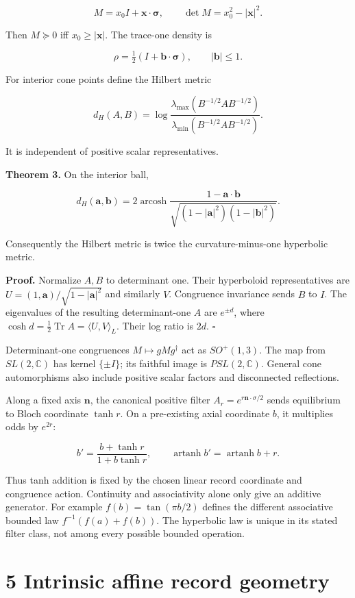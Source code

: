 \documentclass[
  11pt,
  a4paper,
]{article}
\begin{document}
\[M=x_0I+\mathbf x\cdot\boldsymbol\sigma,\qquad
\det M=x_0^2-|\mathbf x|^2.\]

Then \(M\succeq0\) iff \(x_0\ge|\mathbf x|\). The trace-one density is

\[\rho=\tfrac12(I+\mathbf b\cdot\boldsymbol\sigma),\qquad |\mathbf b|\le1.\]

For interior cone points define the Hilbert metric

\[d_H(A,B)=\log\frac{\lambda_{\max}(B^{-1/2}AB^{-1/2})}
{\lambda_{\min}(B^{-1/2}AB^{-1/2})}.\]

It is independent of positive scalar representatives.

\textbf{Theorem 3.} On the interior ball,

\[d_H(\mathbf a,\mathbf b)=2\operatorname{arcosh}
\frac{1-\mathbf a\cdot\mathbf b}
{\sqrt{(1-|\mathbf a|^2)(1-|\mathbf b|^2)}}.\]

Consequently the Hilbert metric is twice the curvature-minus-one hyperbolic metric.

\textbf{Proof.} Normalize \(A,B\) to determinant one. Their hyperboloid representatives are \(U=(1,\mathbf a)/\sqrt{1-|\mathbf a|^2}\) and similarly \(V\). Congruence invariance sends \(B\) to \(I\). The eigenvalues of the resulting determinant-one \(A\) are \(e^{\pm d}\), where \(\cosh d=\tfrac12\operatorname{Tr}A=\langle U,V\rangle_L\). Their log ratio is \(2d\). \(\square\)

Determinant-one congruences \(M\mapsto gMg^\dagger\) act as \(SO^+(1,3)\). The map from \(SL(2,\mathbb C)\) has kernel \(\{\pm I\}\); its faithful image is \(PSL(2,\mathbb C)\). General cone automorphisms also include positive scalar factors and disconnected reflections.

Along a fixed axis \(\mathbf n\), the canonical positive filter \(A_r=e^{r\mathbf n\cdot\sigma/2}\) sends equilibrium to Bloch coordinate \(\tanh r\). On a pre-existing axial coordinate \(b\), it multiplies odds by \(e^{2r}\):

\[b'=\frac{b+\tanh r}{1+b\tanh r},\qquad
\operatorname{artanh}b'=\operatorname{artanh}b+r.\]

Thus tanh addition is fixed by the chosen linear record coordinate and congruence action. Continuity and associativity alone only give an additive generator. For example \(f(b)=\tan(\pi b/2)\) defines the different associative bounded law \(f^{-1}(f(a)+f(b))\). The hyperbolic law is unique in its stated filter class, not among every possible bounded operation.

\section{5 Intrinsic affine record geometry}\label{intrinsic-affine-record-geometry}
\end{document}
